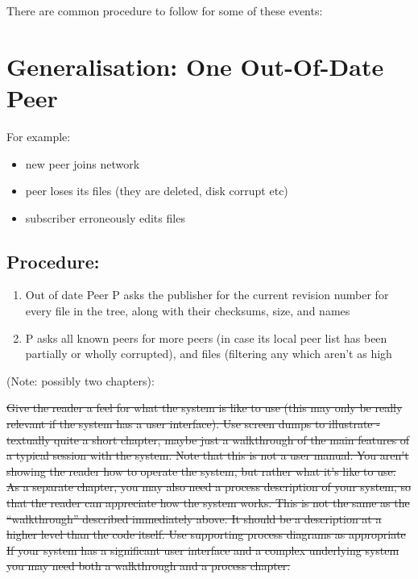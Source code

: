 \documentclass[12pt,a4paper,]{adreport}
\begin{document}
There are common procedure to follow for some of these events:

\section{Generalisation: One Out-Of-Date
Peer}\label{generalisation-one-out-of-date-peer}

For example:

\begin{itemize}
\itemsep1pt\parskip0pt
\item
  new peer joins network
\item
  peer loses its files (they are deleted, disk corrupt etc)
\item
  subscriber erroneously edits files
\end{itemize}

\subsection{Procedure:}\label{procedure}

\begin{enumerate}
\def\labelenumi{\arabic{enumi}.}
\itemsep1pt\parskip0pt
\item
  Out of date Peer P asks the publisher for the current revision number
  for every file in the tree, along with their checksums, size, and
  names
\item
  P asks all known peers for more peers (in case its local peer list has
  been partially or wholly corrupted), and files (filtering any which
  aren't as high
\end{enumerate}

(Note: possibly two chapters):

\sout{Give the reader a feel for what the system is like to use (this
may only be really relevant if the system has a user interface). Use
screen dumps to illustrate - textually quite a short chapter, maybe just
a walkthrough of the main features of a typical session with the system.
Note that this is not a user manual. You aren't showing the reader how
to operate the system, but rather what it's like to use. As a separate
chapter, you may also need a process description of your system, so that
the reader can appreciate how the system works. This is not the same as
the ``walkthrough'' described immediately above. It should be a
description at a higher level than the code itself. Use supporting
process diagrams as appropriate If your system has a significant user
interface and a complex underlying system you may need both a
walkthrough and a process chapter.}
\end{document}

